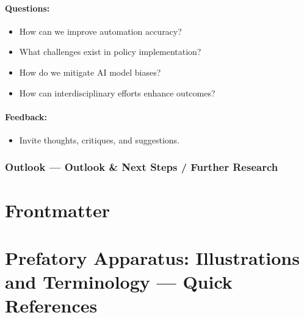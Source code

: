 \documentclass[
  letterpaper,
]{book}
\providecommand{\tightlist}{%
  \setlength{\itemsep}{0pt}\setlength{\parskip}{0pt}}
\begin{document}
\subsubsection{Questions:}\label{questions}

\begin{itemize}
\tightlist
\item
  How can we improve automation accuracy?\\
\item
  What challenges exist in policy implementation?\\
\item
  How do we mitigate AI model biases?\\
\item
  How can interdisciplinary efforts enhance outcomes?
\end{itemize}

\subsubsection{Feedback:}\label{feedback}

\begin{itemize}
\tightlist
\item
  Invite thoughts, critiques, and suggestions.
\end{itemize}

\subsection{Outlook --- Outlook \& Next Steps / Further
Research}\label{outlook-outlook-next-steps-further-research-1}


\chapter*{Frontmatter}\label{frontmatter}



\chapter*{Prefatory Apparatus: Illustrations and Terminology --- Quick
References}\label{prefatory-apparatus-illustrations-and-terminology-quick-references}
\end{document}
